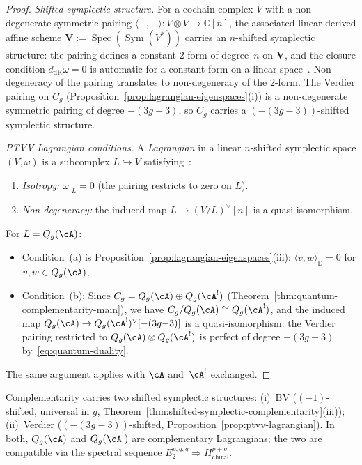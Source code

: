 \begin{proof}
\emph{Shifted symplectic structure.}
For a cochain complex $V$ with a non-degenerate symmetric pairing
$\langle -,- \rangle \colon V \otimes V \to \mathbb{C}[n]$,
the associated linear derived affine scheme
$\mathbf{V} := \operatorname{Spec}(\operatorname{Sym}(V^*))$
carries an $n$-shifted symplectic structure: the pairing defines a
constant $2$-form of degree~$n$ on $\mathbf{V}$, and the closure
condition $d_{\mathrm{dR}}\omega = 0$ is automatic for a constant
form on a linear space~\cite[Example~1.4]{PTVV13}.
Non-degeneracy of the pairing translates to non-degeneracy of the
$2$-form.
The Verdier pairing on $C_g$
(Proposition~\ref{prop:lagrangian-eigenspaces}(i)) is a
non-degenerate symmetric pairing of degree $-(3g{-}3)$, so $C_g$
carries a $(-(3g{-}3))$-shifted symplectic structure.

\emph{PTVV Lagrangian conditions.}
A \emph{Lagrangian} in a linear $n$-shifted symplectic space
$(V, \omega)$ is a subcomplex $L \hookrightarrow V$
satisfying~\cite[Definition~2.8]{PTVV13}:
\begin{enumerate}[label=(\alph*)]
\item \emph{Isotropy:} $\omega|_L = 0$ (the pairing restricts to
  zero on $L$).
\item \emph{Non-degeneracy:} the induced map
  $L \to (V/L)^{\vee}[n]$ is a quasi-isomorphism.
\end{enumerate}
For $L = Q_g(\cA)$:
\begin{itemize}
\item Condition~(a) is
  Proposition~\ref{prop:lagrangian-eigenspaces}(iii):
  $\langle v, w \rangle_{\mathbb{D}} = 0$ for $v, w \in Q_g(\cA)$.
\item Condition~(b): Since
  $C_g = Q_g(\cA) \oplus Q_g(\cA^!)$
  (Theorem~\ref{thm:quantum-complementarity-main}), we have
  $C_g / Q_g(\cA) \cong Q_g(\cA^!)$, and the induced map
  $Q_g(\cA) \to Q_g(\cA^!)^{\vee}[-(3g{-}3)]$ is a
  quasi-isomorphism: the Verdier pairing restricted to
  $Q_g(\cA) \otimes Q_g(\cA^!)$ is perfect of degree $-(3g{-}3)$
  by~\eqref{eq:quantum-duality}.
\end{itemize}
The same argument applies with $\cA$ and~$\cA^!$ exchanged.
\end{proof}

\begin{remark}\label{rem:ptvv-relation}
Complementarity carries two shifted symplectic structures:
(i)~BV ($(-1)$-shifted, universal in $g$,
Theorem~\ref{thm:shifted-symplectic-complementarity}(iii));
(ii)~Verdier ($(-(3g{-}3))$-shifted,
Proposition~\ref{prop:ptvv-lagrangian}).
In both, $Q_g(\cA)$ and $Q_g(\cA^!)$ are complementary Lagrangians;
the two are compatible via the spectral sequence
$E_2^{p,q,g}\Rightarrow H^{p+q}_{\mathrm{chiral}}$.
\end{remark}

